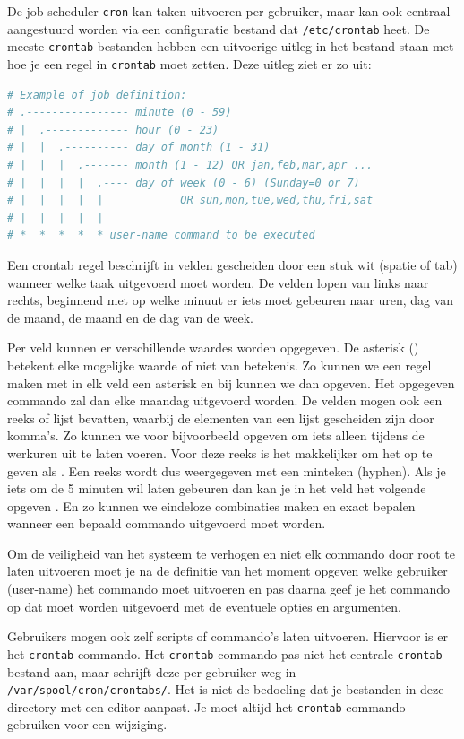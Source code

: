 De job scheduler \texttt{cron} kan taken uitvoeren per gebruiker, maar kan ook centraal aangestuurd worden via een configuratie bestand dat \texttt{/etc/crontab} heet. De meeste \texttt{crontab} bestanden hebben een uitvoerige uitleg in het bestand staan met hoe je een regel in \texttt{crontab} moet zetten. Deze uitleg ziet er zo uit:

\begin{lstlisting}[language=bash]
# Example of job definition:
# .---------------- minute (0 - 59)
# |  .------------- hour (0 - 23)
# |  |  .---------- day of month (1 - 31)
# |  |  |  .------- month (1 - 12) OR jan,feb,mar,apr ...
# |  |  |  |  .---- day of week (0 - 6) (Sunday=0 or 7)
# |  |  |  |  |            OR sun,mon,tue,wed,thu,fri,sat
# |  |  |  |  |
# *  *  *  *  * user-name command to be executed
\end{lstlisting}

Een crontab regel beschrijft in velden gescheiden door een stuk wit (spatie of tab) wanneer welke taak uitgevoerd moet worden. De velden lopen van links naar rechts, beginnend met op welke minuut er iets moet gebeuren naar uren, dag van de maand, de maand en de dag van de week.

Per veld kunnen er verschillende waardes worden opgegeven. De asterisk (\*) betekent elke mogelijke waarde of niet van betekenis. Zo kunnen we een regel maken met in elk veld een asterisk en bij  kunnen we dan  opgeven. Het opgegeven commando zal dan elke maandag uitgevoerd worden. De velden mogen ook een reeks of lijst bevatten, waarbij de elementen van een lijst gescheiden zijn door komma's. Zo kunnen we voor  bijvoorbeeld opgeven  om iets alleen tijdens de werkuren uit te laten voeren. Voor deze reeks is het makkelijker om het op te geven als . Een reeks wordt dus weergegeven met een minteken (hyphen). Als je iets om de 5 minuten wil laten gebeuren dan kan je in het  veld het volgende opgeven . En zo kunnen we eindeloze combinaties maken en exact bepalen wanneer een bepaald commando uitgevoerd moet worden.

Om de veiligheid van het systeem te verhogen en niet elk commando door root te laten uitvoeren moet je na de definitie van het moment opgeven welke gebruiker (user-name) het commando moet uitvoeren en pas daarna geef je het commando op dat moet worden uitgevoerd met de eventuele opties en argumenten.

Gebruikers mogen ook zelf scripts of commando's laten uitvoeren. Hiervoor is er het \texttt{crontab} commando. Het \texttt{crontab} commando pas niet het centrale \texttt{crontab}-bestand aan, maar schrijft deze per gebruiker weg in \texttt{/var/spool/cron/crontabs/}. Het is niet de bedoeling dat je bestanden in deze directory met een editor aanpast. Je moet altijd het \texttt{crontab} commando gebruiken voor een wijziging.

